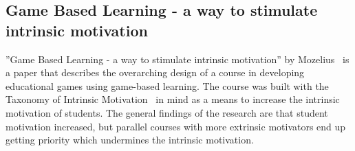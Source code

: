 \subsection{Game Based Learning - a way to stimulate intrinsic motivation} 
''Game Based Learning - a way to stimulate intrinsic motivation'' by Mozelius~\cite{mozelius2014game} is a paper that describes the overarching design of a course in developing educational games using game-based learning. The course was built with the Taxonomy of Intrinsic Motivation~\cite{maloneTax} in mind as a means to increase the intrinsic motivation of students. The general findings of the research are that student motivation increased, but parallel courses with more extrinsic motivators end up getting priority which undermines the intrinsic motivation. 